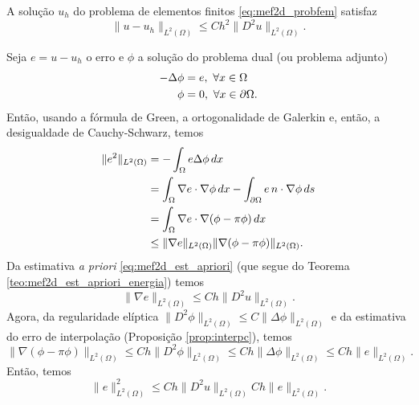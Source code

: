 \begin{teo}
  A solução $u_h$ do problema de elementos finitos \eqref{eq:mef2d_probfem} satisfaz
  \begin{equation}
    \|u-u_h\|_{L^2(\Omega)} \leq Ch^2\|D^2u\|_{L^2(\Omega)}.
  \end{equation}
\end{teo}
\begin{dem}
  Seja $e = u-u_h$ o erro e $\phi$ a solução do problema dual (ou problema adjunto)
  \begin{align}
    -\Delta \phi &= e,~\forall x\in\Omega\\
    \phi &= 0,~\forall x\in\partial\Omega.
  \end{align}
Então, usando a fórmula de Green, a ortogonalidade de Galerkin e, então, a desigualdade de Cauchy-Schwarz, temos
\begin{align}
  \|e^2\|_{L^2(\Omega)} &= -\int_\Omega e\Delta\phi\,dx\\
  &=\int_\Omega \nabla e\cdot\nabla\phi\,dx - \int_{\partial\Omega} e\,n\cdot\nabla \phi\,ds\\
  &=\int_\Omega \nabla e\cdot\nabla(\phi-\pi\phi)\,dx\\
  &\leq\|\nabla e\|_{L^2(\Omega)}\|\nabla(\phi-\pi\phi)\|_{L^2(\Omega)}.
\end{align}
Da estimativa {\it a priori} \eqref{eq:mef2d_est_apriori} (que segue do Teorema \ref{teo:mef2d_est_apriori_energia}) temos
\begin{equation}
  \|\nabla e\|_{L^2(\Omega)} \leq Ch\|D^2u\|_{L^2(\Omega)}.
\end{equation}
Agora, da regularidade elíptica $\|D^2\phi\|_{L^2(\Omega)} \leq C\|\Delta\phi\|_{L^2(\Omega)}$ \cite{Evans1998a} e da estimativa do erro de interpolação (Proposição \ref{prop:interpc}), temos
\begin{equation}
  \|\nabla(\phi-\pi\phi)\|_{L^2(\Omega)} \leq Ch\|D^2\phi\|_{L^2(\Omega)}\leq Ch\|\Delta\phi\|_{L^2(\Omega)} \leq Ch\|e\|_{L^2(\Omega)}.
\end{equation}
Então, temos
\begin{equation}
  \|e\|_{L^2(\Omega)}^2 \leq Ch\|D^2u\|_{L^2(\Omega)}Ch\|e\|_{L^2(\Omega)}.
\end{equation}
\end{dem}


